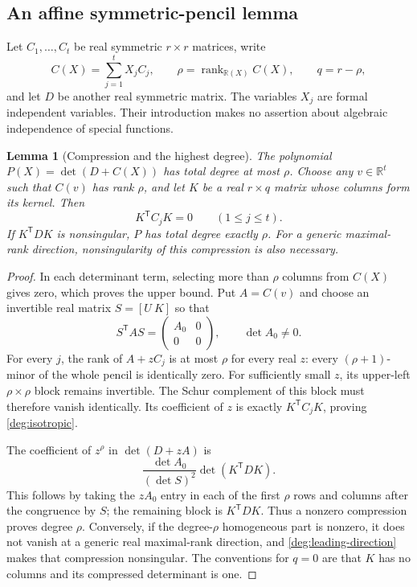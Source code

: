 \documentclass[11pt]{article}
\newtheorem{lemma}[theorem]{Lemma}
\theoremstyle{definition}
\theoremstyle{remark}
\numberwithin{equation}{section}
\begin{document}
\subsection{An affine symmetric-pencil lemma}

Let $C_1,\ldots,C_t$ be real symmetric $r\times r$ matrices, write
\[
 C(X)=\sum_{j=1}^tX_jC_j,
 \qquad \rho=\operatorname{rank}_{\mathbb R(X)} C(X),
 \qquad q=r-\rho,
\]
and let $D$ be another real symmetric matrix.  The variables $X_j$ are
formal independent variables.  Their introduction makes no assertion
about algebraic independence of special functions.

\begin{lemma}[Compression and the highest degree]
\label{deg:compression}
The polynomial $P(X)=\det(D+C(X))$ has total degree at most $\rho$.
Choose any $v\in\mathbb R^t$ such that $C(v)$ has rank $\rho$, and let
$K$ be a real $r\times q$ matrix whose columns form its kernel.
Then
\begin{equation}\label{deg:isotropic}
 K^{\mathsf T}C_jK=0\qquad(1\le j\le t).
\end{equation}
If $K^{\mathsf T}DK$ is nonsingular, $P$ has total degree exactly $\rho$.
For a generic maximal-rank direction, nonsingularity of this compression
is also necessary.
\end{lemma}
\begin{proof}
In each determinant term, selecting more than $\rho$ columns from
$C(X)$ gives zero, which proves the upper bound.  Put $A=C(v)$ and
choose an invertible real matrix $S=[U\ K]$ so that
\[
 S^{\mathsf T}AS=\begin{pmatrix} A_0&0\\0&0\end{pmatrix},
 \qquad \det A_0\ne0.
\]
For every $j$, the rank of $A+zC_j$ is at most $\rho$ for every real
$z$: every $(\rho+1)$-minor of the whole pencil is identically zero.
For sufficiently small $z$, its upper-left $\rho\times\rho$ block
remains invertible.  The Schur complement of this block must therefore
vanish identically.  Its coefficient of $z$ is exactly
$K^{\mathsf T}C_jK$, proving \eqref{deg:isotropic}.

The coefficient of $z^\rho$ in $\det(D+zA)$ is
\begin{equation}\label{deg:leading-direction}
 \frac{\det A_0}{(\det S)^2}\det(K^{\mathsf T}DK).
\end{equation}
This follows by taking the $zA_0$ entry in each of the first $\rho$
rows and columns after the congruence by $S$; the remaining block is
$K^{\mathsf T}DK$.  Thus a nonzero compression proves degree $\rho$.
Conversely, if the degree-$\rho$ homogeneous part is nonzero, it does
not vanish at a generic real maximal-rank direction, and
\eqref{deg:leading-direction} makes that compression nonsingular.
The conventions for $q=0$ are that $K$ has no columns and its
compressed determinant is one.
\end{proof}
\end{document}
